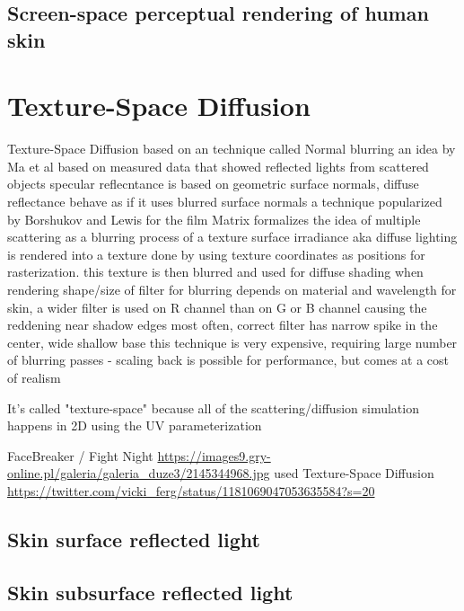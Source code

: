 \documentclass[ngerman,runningheads,a4paper]{llncs}[2018/03/10]
\begin{document}
\citet{pre-integrated-subsurface}

\subsection{Screen-space perceptual rendering of human skin}
\label{sub:screen-space}

\citet{screen-space-subsurface}

\section{Texture-Space Diffusion}
\label{sec:texture-space}

 Texture-Space Diffusion
 based on an technique called Normal blurring
   an idea by Ma et al based on measured data that showed reflected lights from scattered objects specular reflecntance is based on geometric surface normals, diffuse reflectance behave as if it uses blurred surface normals
 a technique popularized by Borshukov and Lewis for the film Matrix
 formalizes the idea of multiple scattering as a blurring process of a texture
 surface irradiance aka diffuse lighting is rendered into a texture
   done by using texture coordinates as positions for rasterization.
   this texture is then blurred and used for diffuse shading when rendering
   shape/size of filter for blurring depends on material and wavelength
     for skin, a wider filter is used on R channel than on G or B channel causing the reddening near shadow edges
     most often, correct filter has narrow spike in the center, wide shallow base
 this technique is very expensive, requiring large number of blurring passes - scaling back is possible for performance, but comes at a cost of realism

\citet{efficient-human-skin-rendering}
It's called "texture-space" because all of the scattering/diffusion simulation happens in 2D using the UV parameterization

FaceBreaker / Fight Night \url{https://images9.gry-online.pl/galeria/galeria_duze3/2145344968.jpg} used Texture-Space Diffusion \url{https://twitter.com/vicki_ferg/status/1181069047053635584?s=20}

\subsection{Skin surface reflected light}
\label{sub:skin-surface-reflect}

\subsection{Skin subsurface reflected light}
\label{sub:skin-subsurface-reflect}
\end{document}
